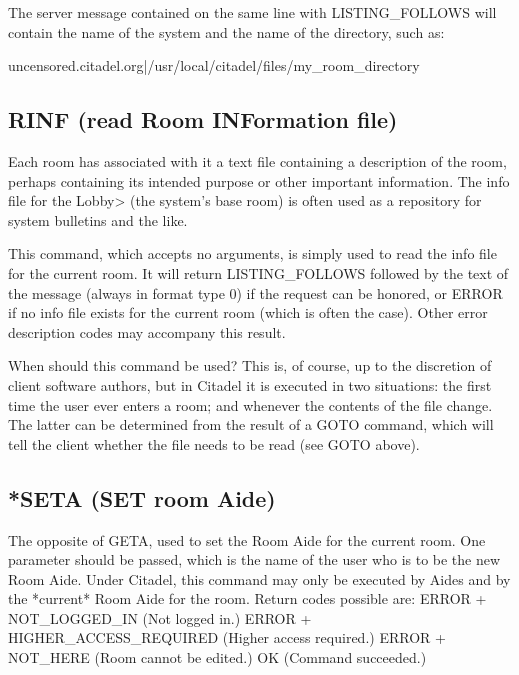  The server message contained on the same line with LISTING_FOLLOWS will
contain the name of the system and the name of the directory, such as:

  uncensored.citadel.org|/usr/local/citadel/files/my_room_directory



\subsection{RINF (read Room INFormation file)}

 Each room has associated with it a text file containing a description of
the room, perhaps containing its intended purpose or other important
information.  The info file for the Lobby> (the system's base room) is
often used as a repository for system bulletins and the like.

 This command, which accepts no arguments, is simply used to read the info
file for the current room.  It will return LISTING_FOLLOWS followed by
the text of the message (always in format type 0) if the request can be
honored, or ERROR if no info file exists for the current room (which is
often the case).  Other error description codes may accompany this result.

 When should this command be used?  This is, of course, up to the discretion
of client software authors, but in Citadel it is executed in two situations:
the first time the user ever enters a room; and whenever the contents of the
file change.  The latter can be determined from the result of a GOTO command,
which will tell the client whether the file needs to be read (see GOTO above).



\subsection{*SETA (SET room Aide)}

 The opposite of GETA, used to set the Room Aide for the current room.  One
parameter should be passed, which is the name of the user who is to be the
new Room Aide.  Under Citadel, this command may only be executed by Aides
and by the *current* Room Aide for the room.  Return codes possible are:
 ERROR + NOT_LOGGED_IN          (Not logged in.)
 ERROR + HIGHER_ACCESS_REQUIRED (Higher access required.)
 ERROR + NOT_HERE               (Room cannot be edited.)
 OK                             (Command succeeded.)



